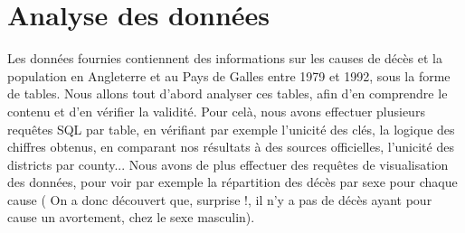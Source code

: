 \chapter{Analyse des données}

 Les données fournies contiennent des informations sur les causes de décès et la population en Angleterre et au Pays de Galles entre 1979 et 1992, sous la forme de tables. Nous allons tout d'abord analyser ces tables, afin d'en comprendre le contenu et d'en vérifier la validité. Pour celà, nous avons effectuer plusieurs requêtes SQL par table, en vérifiant par exemple l'unicité des clés, la logique des chiffres obtenus, en comparant nos résultats à des sources officielles, l'unicité des districts par county... Nous avons de plus effectuer des requêtes de visualisation des données, pour voir par exemple la répartition des décès par sexe pour chaque cause ( On a donc découvert que, surprise !, il n'y a pas de décès ayant pour cause un avortement, chez le sexe masculin).\\


